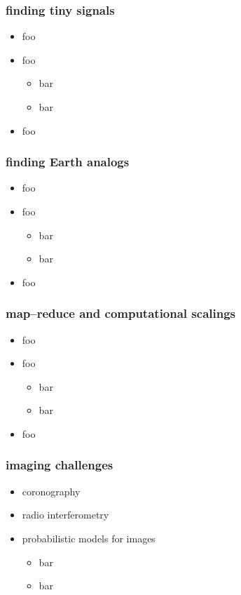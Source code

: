 \documentclass[pdftex]{beamer}
\begin{document}
\begin{frame}
  \frametitle{finding tiny signals}
  \begin{itemize}
  \item foo
  \item foo
    \begin{itemize}
    \item bar
    \item bar
    \end{itemize}
  \item foo
  \end{itemize}
\end{frame}

\begin{frame}
  \frametitle{finding Earth analogs}
  \begin{itemize}
  \item foo
  \item foo
    \begin{itemize}
    \item bar
    \item bar
    \end{itemize}
  \item foo
  \end{itemize}
\end{frame}

\begin{frame}
  \frametitle{map--reduce and computational scalings}
  \begin{itemize}
  \item foo
  \item foo
    \begin{itemize}
    \item bar
    \item bar
    \end{itemize}
  \item foo
  \end{itemize}
\end{frame}

\begin{frame}
  \frametitle{imaging challenges}
  \begin{itemize}
  \item coronography
  \item radio interferometry
  \item probabilistic models for images
    \begin{itemize}
    \item bar
    \item bar
    \end{itemize}
  \end{itemize}
\end{frame}
\end{document}
